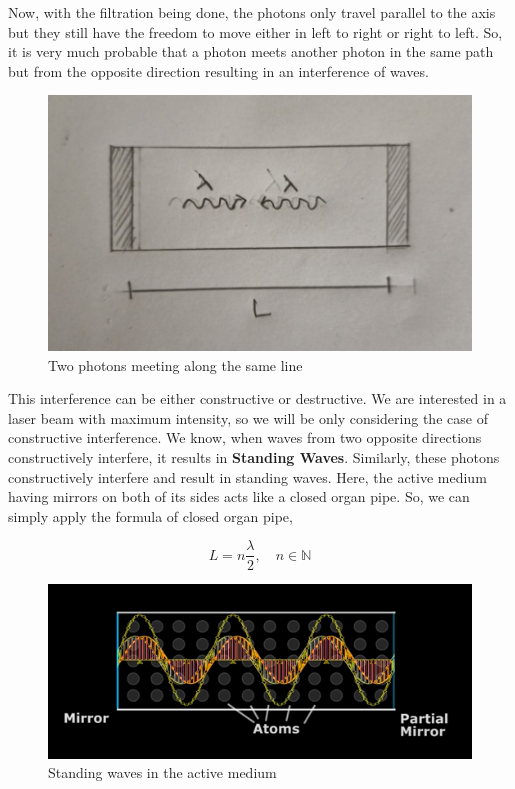 \documentclass[12pt]{article}
\begin{document}
Now, with the filtration being done, the photons only travel parallel to the axis but they still have the freedom to move either in left to right or right to left. So, it is very much probable that a photon meets another photon in the same path but from the opposite direction resulting in an interference of waves. \vspace{.2cm}

\begin{figure}[H]
    \centering
    \includegraphics[scale=.8]{./img/13_meeting_waves.png}
    \caption{Two photons meeting along the same line}
\end{figure}

This interference can be either constructive or destructive. We are interested in a laser beam with maximum intensity, so we will be only considering the case of constructive interference. We know, when waves from two opposite directions constructively interfere, it results in \textbf{Standing Waves}. Similarly, these photons constructively interfere and result in standing waves. Here, the active medium having mirrors on both of its sides acts like a closed organ pipe. So, we can simply apply the formula of closed organ pipe, \vspace{.2cm}

\begin{equation}
    L = n\frac{\lambda}{2}, \quad n \in \mathbb{N}
\end{equation}

\begin{figure}[H]
    \centering
    \includegraphics[scale=.8]{./img/14_standing_waves.png}
    \caption{Standing waves in the active medium}
\end{figure}
\end{document}
